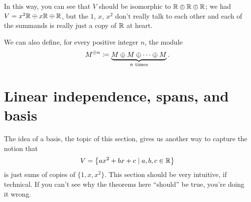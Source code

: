 In this way, you can see that $V$ should be isomorphic
to $\mathbb R \oplus \mathbb R \oplus \mathbb R$;
we had $V = x^2\mathbb R \oplus x\mathbb R \oplus \mathbb R$,
but the $1$, $x$, $x^2$ don't really talk to each other
and each of the summands is really just a copy of $\mathbb R$ at heart.

\begin{definition}
	We can also define, for every positive integer $n$, the module
	\[ M^{\oplus n}
		\coloneqq \underbrace{M \oplus M \oplus \dots \oplus M}_{\text{$n$ times}}. \]
\end{definition}

\section{Linear independence, spans, and basis}

The idea of a basis, the topic of this section,
gives us another way to capture the notion that
\[ V = \left\{ ax^2+bx+c \mid a,b,c \in \mathbb R \right\} \]
is just sums of copies of $\{1,x,x^2\}$.
This section should be very intuitive, if technical.
If you can't see why the theorems here ``should'' be true,
you're doing it wrong.

